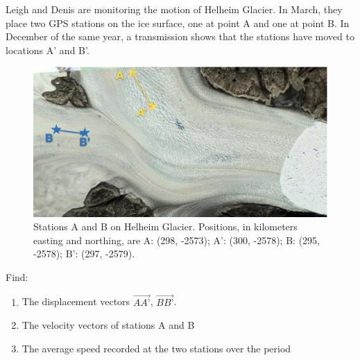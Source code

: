 \documentclass[12pt]{article}
\newenvironment{problem}[2][Problem]{\begin{trivlist}
\item[\hskip \labelsep {\bfseries #1}\hskip \labelsep {\bfseries #2.}]}{\end{trivlist}}
\begin{document}
\begin{problem}{3}
[3 pts] Leigh and Denis are monitoring the motion of Helheim Glacier.  In March, they place two GPS stations on the ice surface, one at point A and one at point B.  In December of the same year, a transmission shows that the stations have moved to locations A’ and B’.

\begin{figure}
    \centering
    \includegraphics[width=1.0\linewidth]{figs/PS1-Helheim plot.jpeg}
    \caption{Stations A and B on Helheim Glacier.  Positions, in kilometers easting and northing, are A: (298, -2573); A': (300, -2578); B: (295, -2578); B': (297, -2579).}
    \label{fig:helheim}
\end{figure}


Find:
\renewcommand{\labelenumi}{(\alph{enumi})}
\begin{enumerate}
\setlength\itemsep{0.2em}
    \item The displacement vectors $\overrightarrow{AA’}$, $\overrightarrow{BB’}$.
    \item The velocity vectors of stations A and B
    \item The average speed recorded at the two stations over the period
\end{enumerate}


\end{problem}
\end{document}
